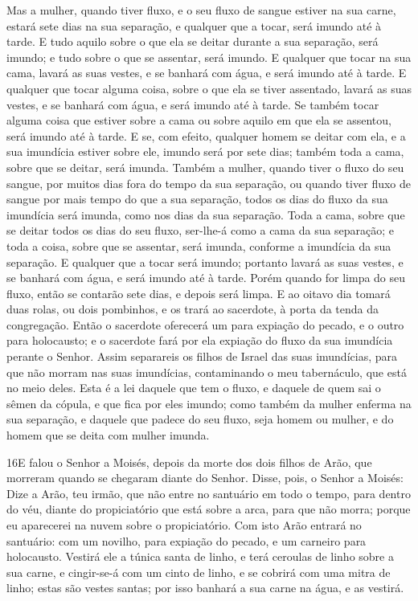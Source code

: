 Mas a mulher, quando tiver fluxo, e o seu fluxo de sangue estiver
na sua carne, estará sete dias na sua separação, e qualquer que a
tocar, será imundo até à tarde. E tudo aquilo sobre o que ela
se deitar durante a sua separação, será imundo; e tudo sobre o que
se assentar, será imundo. E qualquer que tocar na sua cama,
lavará as suas vestes, e se banhará com água, e será imundo até à
tarde. E qualquer que tocar alguma coisa, sobre o que ela se
tiver assentado, lavará as suas vestes, e se banhará com água, e
será imundo até à tarde. Se também tocar alguma coisa que
estiver sobre a cama ou sobre aquilo em que ela se assentou, será
imundo até à tarde. E se, com efeito, qualquer homem se
deitar com ela, e a sua imundícia estiver sobre ele, imundo será por
sete dias; também toda a cama, sobre que se deitar, será imunda.
Também a mulher, quando tiver o fluxo do seu sangue, por
muitos dias fora do tempo da sua separação, ou quando tiver fluxo de
sangue por mais tempo do que a sua separação, todos os dias do fluxo
da sua imundícia será imunda, como nos dias da sua separação.
Toda a cama, sobre que se deitar todos os dias do seu fluxo,
ser-lhe-á como a cama da sua separação; e toda a coisa, sobre que se
assentar, será imunda, conforme a imundícia da sua separação.
E qualquer que a tocar será imundo; portanto lavará as suas
vestes, e se banhará com água, e será imundo até à tarde.
Porém quando for limpa do seu fluxo, então se contarão sete
dias, e depois será limpa. E ao oitavo dia tomará duas rolas,
ou dois pombinhos, e os trará ao sacerdote, à porta da tenda da
congregação. Então o sacerdote oferecerá um para expiação do
pecado, e o outro para holocausto; e o sacerdote fará por ela
expiação do fluxo da sua imundícia perante o Senhor. Assim
separareis os filhos de Israel das suas imundícias, para que não
morram nas suas imundícias, contaminando o meu tabernáculo, que está
no meio deles. Esta é a lei daquele que tem o fluxo, e
daquele de quem sai o sêmen da cópula, e que fica por eles imundo;
como também da mulher enferma na sua separação, e daquele que
padece do seu fluxo, seja homem ou mulher, e do homem que se deita
com mulher imunda.

\medskip

\lettrine{16} E falou o Senhor a Moisés, depois da morte dos
dois filhos de Arão, que morreram quando se chegaram diante do
Senhor. Disse, pois, o Senhor a Moisés: Dize a Arão, teu irmão,
que não entre no santuário em todo o tempo, para dentro do véu,
diante do propiciatório que está sobre a arca, para que não morra;
porque eu aparecerei na nuvem sobre o propiciatório. Com isto
Arão entrará no santuário: com um novilho, para expiação do pecado,
e um carneiro para holocausto. Vestirá ele a túnica santa de
linho, e terá ceroulas de linho sobre a sua carne, e cingir-se-á com
um cinto de linho, e se cobrirá com uma mitra de linho; estas são
vestes santas; por isso banhará a sua carne na água, e as vestirá.

